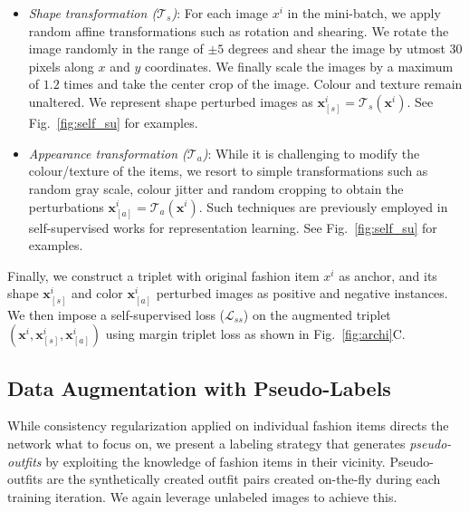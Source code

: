 \documentclass[sigconf]{acmart}
\begin{document}
\begin{itemize}
    \item \textit{Shape transformation ($\mathcal{T}_s$)}: For each image $x^i$ in the mini-batch, we apply random affine transformations such as rotation and shearing. We rotate the image randomly in the range of $\pm5$ degrees and shear the image by utmost $30$ pixels along $x$ and $y$ coordinates. We finally scale the images by a maximum of $1.2$ times and take the center crop of the image. Colour and texture remain unaltered. We represent shape perturbed images as $\mathbf{x}^i_{[s]} = \mathcal{T}_s (\mathbf{x}^i)$. See Fig.~\ref{fig:self_su} for examples.
    
     \item \textit{Appearance transformation ($\mathcal{T}_a$)}: 
    While it is challenging to modify the colour/texture of the items, we resort to simple transformations such as random gray scale, colour jitter and random cropping to obtain the perturbations $\mathbf{x}^i_{[a]}= \mathcal{T}_a (\mathbf{x}^i)$. Such techniques are previously employed in self-supervised works \cite{moco,simclr} for representation learning. See Fig.~\ref{fig:self_su} for examples.
\end{itemize}

Finally, we construct a triplet with original fashion item $x^i$ as anchor, and its shape $\mathbf{x}^i_{[s]}$ and color $\mathbf{x}^i_{[a]}$ perturbed images as positive and negative instances. We then impose a self-supervised loss ($\mathcal{L}_{ss}$) on the augmented triplet $(\mathbf{x}^i, \mathbf{x}^i_{[s]}, \mathbf{x}^i_{[a]})$ using margin triplet loss as shown in Fig.~\ref{fig:archi}{C}.

\subsection{Data Augmentation with Pseudo-Labels}

\label{sec:l_pseudo}
While consistency regularization applied on individual fashion items directs the network what to focus on, we present a labeling strategy that generates {\em pseudo-outfits} by exploiting the knowledge of fashion items in their vicinity. Pseudo-outfits are the synthetically created outfit pairs created on-the-fly during each training iteration. We again leverage unlabeled images to achieve this.
\end{document}
